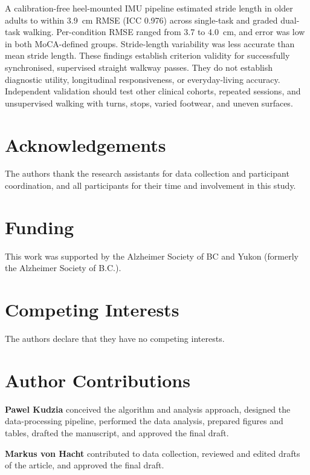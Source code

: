 \documentclass[11pt]{article}
\begin{document}
A calibration-free heel-mounted IMU pipeline estimated stride length in older adults to within 3.9~cm RMSE (ICC 0.976) across single-task and graded dual-task walking. Per-condition RMSE ranged from 3.7 to 4.0~cm, and error was low in both MoCA-defined groups. Stride-length variability was less accurate than mean stride length. These findings establish criterion validity for successfully synchronised, supervised straight walkway passes. They do not establish diagnostic utility, longitudinal responsiveness, or everyday-living accuracy. Independent validation should test other clinical cohorts, repeated sessions, and unsupervised walking with turns, stops, varied footwear, and uneven surfaces.

\clearpage
\section*{Acknowledgements}

The authors thank the research assistants for data collection and participant coordination, and all participants for their time and involvement in this study.

\section*{Funding}

This work was supported by the Alzheimer Society of BC and Yukon (formerly the Alzheimer Society of B.C.).

\section*{Competing Interests}

The authors declare that they have no competing interests.

\section*{Author Contributions}

\textbf{Pawel Kudzia} conceived the algorithm and analysis approach, designed the data-processing pipeline, performed the data analysis, prepared figures and tables, drafted the manuscript, and approved the final draft.

\textbf{Markus von Hacht} contributed to data collection, reviewed and edited drafts of the article, and approved the final draft.
\end{document}
